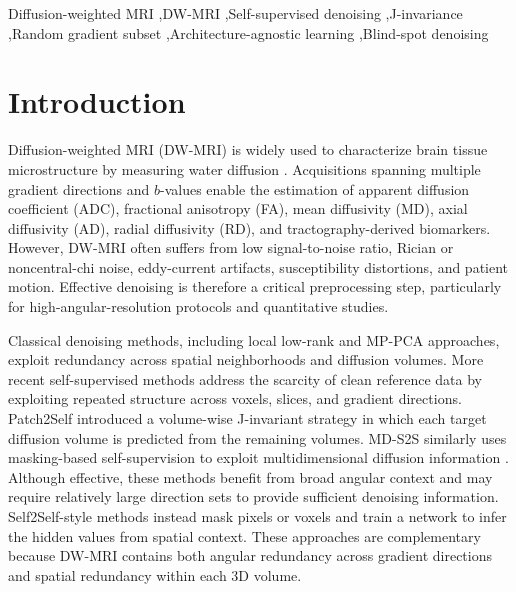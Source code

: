\documentclass[preprint,12pt]{elsarticle}
\begin{document}
\begin{frontmatter}
\begin{abstract}
yields worse FA-MAE. These findings show that Hybrid RGS transfers across distinct backbones, while controlled claims about dimensionality and capacity should be drawn from the Restormer family and remain dependent on the selected operating point. Experiments on Stanford HARDI demonstrate feasibility on real scanner data without ground truth and scalability to larger gradient shells while keeping the per-sample channel count fixed.
  \end{abstract}

  \begin{keyword}
    Diffusion-weighted MRI \sep DW-MRI \sep Self-supervised denoising \sep J-invariance \sep Random gradient subset \sep Architecture-agnostic learning \sep Blind-spot denoising
  \end{keyword}

\end{frontmatter}

\section{Introduction}

Diffusion-weighted MRI (DW-MRI) is widely used to characterize brain tissue microstructure by measuring water diffusion \cite{dwimri}. Acquisitions spanning multiple gradient directions and $b$-values enable the estimation of apparent diffusion coefficient (ADC), fractional anisotropy (FA), mean diffusivity (MD), axial diffusivity (AD), radial diffusivity (RD), and tractography-derived biomarkers. However, DW-MRI often suffers from low signal-to-noise ratio, Rician or noncentral-chi noise, eddy-current artifacts, susceptibility distortions, and patient motion. Effective denoising is therefore a critical preprocessing step, particularly for high-angular-resolution protocols and quantitative studies.

Classical denoising methods, including local low-rank and MP-PCA approaches, exploit redundancy across spatial neighborhoods and diffusion volumes. More recent self-supervised methods address the scarcity of clean reference data by exploiting repeated structure across voxels, slices, and gradient directions. Patch2Self introduced a volume-wise J-invariant strategy in which each target diffusion volume is predicted from the remaining volumes. MD-S2S similarly uses masking-based self-supervision to exploit multidimensional diffusion information \cite{kang2024mds2s}. Although effective, these methods benefit from broad angular context and may require relatively large direction sets to provide sufficient denoising information. Self2Self-style methods instead mask pixels or voxels and train a network to infer the hidden values from spatial context. These approaches are complementary because DW-MRI contains both angular redundancy across gradient directions and spatial redundancy within each 3D volume.
\end{document}

